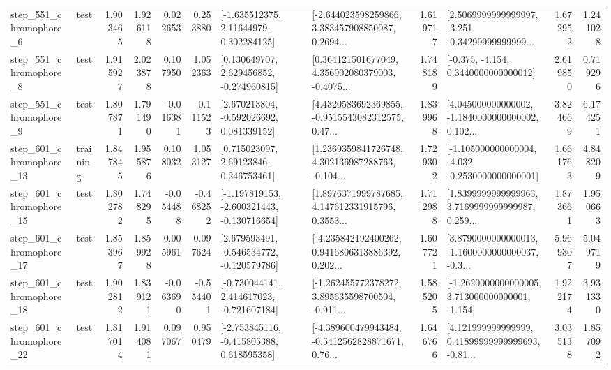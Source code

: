 \begin{tabular}{llrrrrllrlrr}
   step\_551\_chromophore\_6 &      test &      1.903465 &    1.926118 &      0.022653 &  0.253880 &     [-1.635512375, 2.11644979, 0.302284125] &  [-2.644023598259866, 3.383457908850087, 0.2694... &       1.619717 &  [2.5069999999999997, -3.251, -0.34299999999999... &            1.672952 &          1.241028 \\
   step\_551\_chromophore\_8 &      test &      1.915927 &    2.023878 &      0.107950 &  1.052363 &    [0.130649707, 2.629456852, -0.274960815] &  [0.364121501677049, 4.356902080379003, -0.4075... &       1.748189 &               [-0.375, -4.154, 0.3440000000000012] &            2.619850 &          0.719296 \\
   step\_551\_chromophore\_9 &      test &      1.807871 &    1.791490 &     -0.016381 & -0.111523 &    [2.670213804, -0.592026692, 0.081339152] &  [4.4320583692369855, -0.9515543082312575, 0.47... &       1.839968 &  [4.045000000000002, -1.1840000000000002, 0.102... &            3.824669 &          6.174251 \\
  step\_601\_chromophore\_13 &  training &      1.847845 &    1.955876 &      0.108032 &  1.053127 &      [0.715023097, 2.69123846, 0.246753461] &  [1.2369359841726748, 4.302136987288763, -0.104... &       1.729302 &  [-1.105000000000004, -4.032, -0.2530000000000001] &            1.661763 &          4.848209 \\
  step\_601\_chromophore\_15 &      test &      1.802782 &    1.748295 &     -0.054488 & -0.468252 &  [-1.197819153, -2.600321443, -0.130716654] &  [1.8976371999787685, 4.147612331915796, 0.3553... &       1.712988 &  [1.8399999999999963, 3.7169999999999987, 0.259... &            1.873661 &          1.950663 \\
  step\_601\_chromophore\_17 &      test &      1.853967 &    1.859928 &      0.005961 &  0.097624 &   [2.679593491, -0.546534772, -0.120579786] &  [-4.235842192400262, 0.9416806313886392, 0.202... &       1.607721 &  [3.8790000000000013, -1.1600000000000037, -0.3... &            5.969307 &          5.049719 \\
  step\_601\_chromophore\_18 &      test &      1.902812 &    1.839121 &     -0.063690 & -0.554401 &   [-0.730044141, 2.414617023, -0.721607184] &  [-1.262455772378272, 3.895635598700504, -0.911... &       1.585205 &   [-1.2620000000000005, 3.713000000000001, -1.154] &            1.922174 &          3.931330 \\
  step\_601\_chromophore\_22 &      test &      1.817014 &    1.914081 &      0.097067 &  0.950479 &   [-2.753845116, -0.415805388, 0.618595358] &  [-4.389600479943484, -0.5412562828871671, 0.76... &       1.646766 &  [4.121999999999999, 0.41899999999999693, -0.81... &            3.035138 &          1.857092 \\

\end{tabular}
